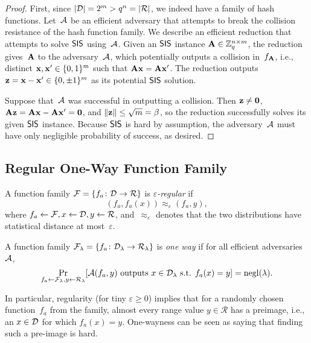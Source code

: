 \documentclass[11pt]{article}
\newcommand{\calR}{\ensuremath{\mathcal{R}}}
\begin{document}
\begin{proof}
  First, since $\abs{\calD}=2^{m} > q^{n} = \abs{\calR}$, we indeed
  have a family of hash functions. Let~$\mathcal{A}$ be an efficient
  adversary that attempts to break the collision resistance of the
  hash function family. We describe an efficient reduction that
  attempts to solve $\mathsf{SIS}$ using~$\mathcal{A}$. Given an $\mathsf{SIS}$ instance
  $\mathbf{A} \in \mathbb{Z}_q^{n \times m}$, the reduction gives~$\mathbf{A}$ to the
  adversary~$\mathcal{A}$, which potentially outputs a collision
  in~$f_{\mathbf{A}}$, i.e., distinct $\mathbf{x}, \mathbf{x}' \in \{0,1\}^{m}$ such
  that $\mathbf{A}\mathbf{x}=\mathbf{A}\mathbf{x}'$. The reduction outputs
  $\mathbf{z} = \mathbf{x}-\mathbf{x}' \in \{0, \pm 1\}^{m}$ as its potential
  $\mathsf{SIS}$ solution.

  Suppose that~$\mathcal{A}$ was successful in outputting a collision. Then
  $\mathbf{z} \neq \mathbf{0}$,
  $\mathbf{A}\mathbf{z} = \mathbf{A}\mathbf{x} - \mathbf{A}\mathbf{x}' = \mathbf{0}$, and
  $\lVert\mathbf{z}\rVert \leq \sqrt{m} = \beta$, so the reduction
  successfully solves its given $\mathsf{SIS}$ instance. Because $\mathsf{SIS}$ is
  hard by assumption, the adversary~$\mathcal{A}$ must have only negligible
  probability of success, as desired.
\end{proof}

\subsection{Regular One-Way Function Family}
\label{sec:regular-one-way}

\begin{definition}
  A function family $\calF = \set{f_a \colon \calD \to \calR}$ is
  \emph{$\varepsilon$-regular} if
  \[ (f_a, f_a(x)) \approx_{\varepsilon} (f_a, y) , \] where
  $f_{a} \gets \calF, x \gets \calD, y \gets \calR$,
  and~$\approx_{\varepsilon}$ denotes that the two distributions have
  statistical distance at most~$\varepsilon$.
\end{definition}

\begin{definition}
  A function family
  $\calF_{\lambda} = \set{f_{a} \colon \calD_{\lambda} \to
    \calR_{\lambda}}$ is \emph{one way} if for all efficient
  adversaries~$\mathcal{A}$,
  \[\Pr_{f_a \gets \calF_{\lambda}, y \gets \calR_{\lambda}}[\Adv(f_a,
    y) \text{ outputs } x \in \calD_{\lambda} \text{ s.t. } f_a(x)=y]
    = \negl(\lambda) . \]
\end{definition}

In particular, regularity (for tiny $\varepsilon \geq 0$) implies that
for a randomly chosen function~$f_{a}$ from the family, almost every
range value $y \in \calR$ has a preimage, i.e., an $x \in \mathcal{D}$ for
which $f_{a}(x)=y$. One-wayness can be seen as saying that finding
such a pre-image is hard.
\end{document}
